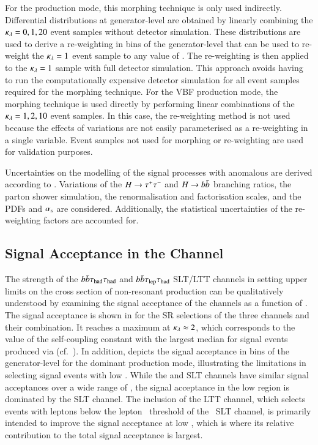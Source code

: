 For the \ggF production mode, this morphing technique is only used
indirectly. Differential distributions at generator-level are obtained
by linearly combining the $\kappa_{\lambda} = 0, 1, 20$ event samples without
detector simulation. These distributions are used to derive a
re-weighting in bins of the generator-level \mHH that can be used to
re-weight the $\kappa_{\lambda} = 1$ event sample to any value of
\klambda. The re-weighting is then applied to the $\kappa_{\lambda} = 1$
sample with full detector simulation. This approach avoids having to
run the computationally expensive detector simulation for all event
samples required for the morphing technique. For the VBF production
mode, the morphing technique is used directly by performing linear
combinations of the $\kappa_{\lambda} = 1, 2, 10$ event samples. In this case,
the re-weighting method is not used because the effects of \klambda
variations are not easily parameterised as a re-weighting in a single
variable. Event samples not used for morphing or re-weighting are used
for validation purposes.

Uncertainties on the modelling of the signal processes with anomalous
\klambda are derived according to .
Variations of the $H \to \tau^{+} \tau^{-}$ and $H \to b\bar{b}$ branching ratios,
the parton shower simulation, the renormalisation and factorisation
scales, and the PDFs and $\alpha_{\text{s}}$ are considered. Additionally, the
statistical uncertainties of the \klambda re-weighting factors are
accounted for.


\subsection{Signal Acceptance in the \bbtautau Channel}%
\label{sec:self_coupling_bbtt_limitations}

The strength of the $b\bar{b}\tau_{\text{had}}\tau_{\text{had}}$ and $b\bar{b}\tau_{\text{lep}}\tau_{\text{had}}$ SLT/LTT channels in
setting upper limits on the cross section of non-resonant \HH production can be
qualitatively understood by examining the signal acceptance of the channels as a
function of \klambda. The signal acceptance is shown in
 for the SR selections of the three
channels and their combination. It reaches a maximum at $\kappa_{\lambda} \approx 2$,
which corresponds to the value of the self-coupling constant with the largest
median \mHH for signal events produced via \ggF
(cf.~). In addition, 
depicts the signal acceptance in bins of the generator-level \mHH for the
dominant \ggF production mode, illustrating the limitations in selecting signal
events with low \mHH. While the \hadhad and \lephad SLT channels have similar
signal acceptances over a wide range of \mHH, the signal acceptance in the low
\mHH region is dominated by the \lephad SLT channel. The inclusion of the
\lephad LTT channel, which selects events with leptons below the lepton
\pT~threshold of the \lephad~SLT channel, is primarily intended to improve the
signal acceptance at low \mHH, which is where its relative contribution to the
total signal acceptance is largest.

